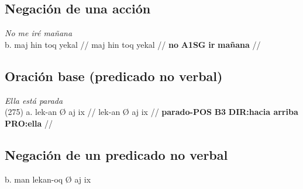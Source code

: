 \documentclass{article}%
\begin{document}
\subsection{Negación de una acción}%
\label{subsec:Negacindeunaaccin}%

%
\par\medskip%
\ex
\textit{No me iré mañana} \\
\begingl
\gla b. maj hin toq yekal //
\glb maj hin toq yekal //
\glc \textbf{no} \textbf{A1SG} \textbf{ir} \textbf{mañana} //
\endgl
\xe
%
\medskip%
\subsection{Oración base (predicado no verbal)}%
\label{subsec:Oracinbase(predicadonoverbal)}%

%
\par\medskip%
\ex
\textit{Ella está parada} \\
\begingl
\gla (275) a. lek-an Ø aj ix //
\glb lek-an Ø aj ix //
\glc \textbf{parado-}\textbf{POS} \textbf{B3} \textbf{DIR:hacia arriba} \textbf{PRO:ella} //
\endgl
\xe
%
\medskip%
\subsection{Negación de un predicado no verbal}%
\label{subsec:Negacindeunpredicadonoverbal}%

%
b. man lekan{-}oq Ø aj ix 

%
\end{document}
